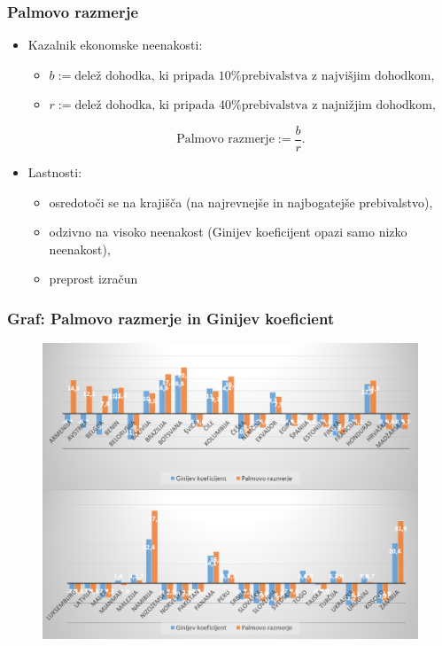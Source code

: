 \documentclass[10pt]{beamer}
\begin{document}
\begin{frame}
\frametitle{Palmovo razmerje}
\begin{itemize}
\item Kazalnik ekonomske neenakosti:

\begin{itemize}
\item $b := \textrm{delež dohodka, ki pripada 10\% prebivalstva z najvišjim dohodkom},$
\item $r := \textrm{delež dohodka, ki pripada 40\% prebivalstva z najnižjim dohodkom},$
\end{itemize}
$$
\textrm{Palmovo razmerje} := \frac{b}{r}.
$$

\item Lastnosti:
\begin{itemize}
\item osredotoči se na krajišča (na najrevnejše in najbogatejše prebivalstvo),
\item odzivno na visoko neenakost (Ginijev koeficijent opazi samo nizko neenakost),
\item preprost izračun
\end{itemize}
\end{itemize}
\end{frame}

\begin{frame}
\frametitle{Graf: Palmovo razmerje in Ginijev koeficient}
\begin{figure}
\includegraphics[scale = 0.87]{./slike/gini_palma.png}
\end{figure}

\end{frame}
\end{document}
